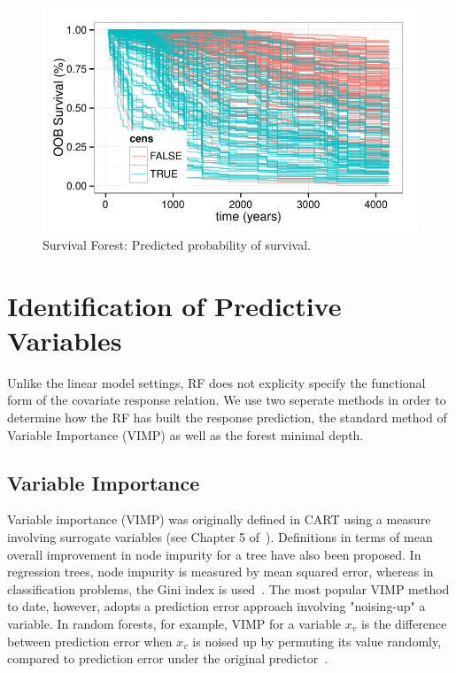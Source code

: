 \documentclass[nojss]{jss}\usepackage[]{graphicx}\usepackage[]{color}
\makeatletter
\def\maxwidth{ %
  \ifdim\Gin@nat@width>\linewidth
    \linewidth
  \else
    \Gin@nat@width
  \fi
}
\newenvironment{knitrout}{}{} %
\makeatother
\begin{document}
\begin{knitrout}\footnotesize
{}\color{fgcolor}\begin{figure}[!htpb]

{\centering \includegraphics[width=\maxwidth]{figure/vig-surv-rf-plot-1} 

}

\caption[Survival Forest]{Survival Forest: Predicted probability of survival.\label{fig:surv-rf-plot}}
\end{figure}


\end{knitrout}


\section{Identification of Predictive Variables}
Unlike the linear model settings, RF does not explicity specify the functional form of the covariate response relation. We use two seperate methods in order to determine how the RF has built the response prediction, the standard method of Variable Importance (VIMP) as well as the forest minimal depth.


\subsection{Variable Importance}\label{S:vimp}
Variable importance (VIMP) was originally defined in CART using a measure involving surrogate variables (see Chapter 5 of~\cite{cart:1984}). Definitions in terms of mean overall improvement in node impurity for a tree have also been proposed. In regression trees, node impurity is measured by mean squared error, whereas in classification problems, the Gini index is used~\citep{FriedmanGreedyfunction:2000}. The most popular VIMP method to date, however, adopts a prediction error approach involving "noising-up" a variable. In random forests, for example, VIMP for a variable $x_v$ is the difference between prediction error when $x_v$ is noised up by permuting its value randomly, compared to prediction error under the original predictor~\citep{Breiman:2001,liaw:2002,Ishwaran:2007,Ishwaran:2008}.
\end{document}
